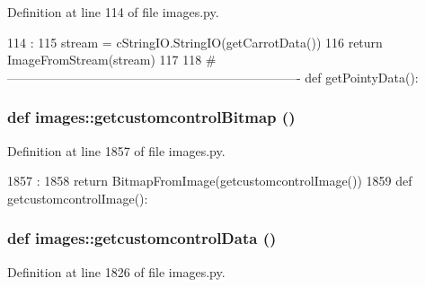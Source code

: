 Definition at line 114 of file images.py.


\begin{DoxyCode}
114                     :
115     stream = cStringIO.StringIO(getCarrotData())
116     return ImageFromStream(stream)
117 
118 #----------------------------------------------------------------------
def getPointyData():
\end{DoxyCode}
\hypertarget{namespaceimages_a6077600c5ff26254f7bf9cd570ed3ff0}{
\subsubsection[{getcustomcontrolBitmap}]{\setlength{\rightskip}{0pt plus 5cm}def images::getcustomcontrolBitmap ()}}
\label{namespaceimages_a6077600c5ff26254f7bf9cd570ed3ff0}


Definition at line 1857 of file images.py.


\begin{DoxyCode}
1857                             :
1858     return BitmapFromImage(getcustomcontrolImage())
1859 
def getcustomcontrolImage():
\end{DoxyCode}
\hypertarget{namespaceimages_afb57d37a022985579a78e4e6eff7628c}{
\subsubsection[{getcustomcontrolData}]{\setlength{\rightskip}{0pt plus 5cm}def images::getcustomcontrolData ()}}
\label{namespaceimages_afb57d37a022985579a78e4e6eff7628c}


Definition at line 1826 of file images.py.


